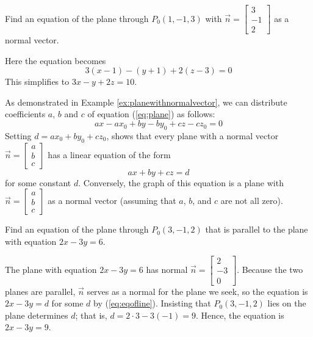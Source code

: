 \documentclass{ximera}
\begin{document}
\begin{example}\label{ex:planewithnormalvector}
Find an equation of the plane through $P_{0}(1, -1, 3)$ with $\vec{n} = 
\begin{bmatrix}
3\\
-1\\
2
\end{bmatrix}$
 as a normal vector.
\begin{explanation}
  Here the equation becomes
\begin{equation*}
3(x - 1) - (y + 1) + 2(z - 3) = 0
\end{equation*}
This simplifies to $3x - y + 2z = 10$.
\end{explanation}
\end{example}

As demonstrated in Example \ref{ex:planewithnormalvector}, we can distribute coefficients $a$, $b$ and $c$  of equation (\ref{eq:plane}) as follows:
$$ax-ax_0+by-by_0+cz-cz_0=0$$
Setting $d = ax_{0} + by_{0} + cz_{0}$, shows that every plane with a normal vector $\vec{n} =
\begin{bmatrix}
a\\
b\\
c
\end{bmatrix}$
 has a linear equation of the form
\begin{equation} \label{eq:eqofline} 
ax + by + cz = d
\end{equation}
for some constant $d$. Conversely, the graph of this equation is a plane with $\vec{n} =
\begin{bmatrix}
a\\
b\\
c
\end{bmatrix}$ as a normal vector (assuming that $a$, $b$, and $c$ are not all zero).


\begin{example}\label{ex:planeparalleltoplane}
Find an equation of the plane through $P_{0}(3, -1, 2)$ that is parallel to the plane with equation $2x - 3y = 6$.


\begin{explanation}
The plane with equation $2x -3y = 6$ has normal $\vec{n} =
\begin{bmatrix}
2\\
-3\\
0
\end{bmatrix}$. Because the two planes are parallel, $\vec{n}$ serves as a normal for the plane we seek, so the equation is $2x - 3y = d$ for some $d$ by (\ref{eq:eqofline}). Insisting that $P_{0}(3, -1, 2)$ lies on the plane determines $d$; that is, $d = 2 \cdot 3 - 3(-1) = 9$. Hence, the equation is $2x - 3y = 9$.
\end{explanation}
\end{example}
\end{document}
